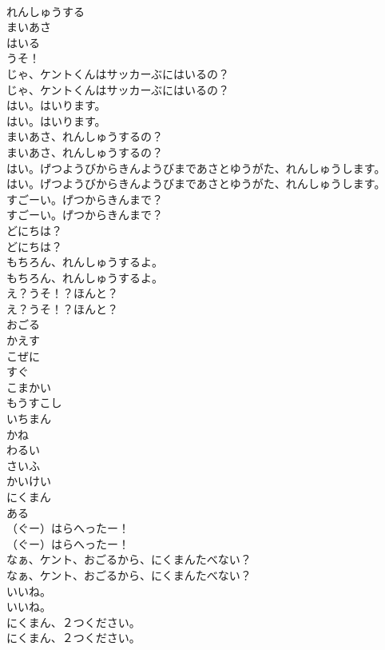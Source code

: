 \documentclass[8pt]{extreport}
\begin{document}
\begin{CJK}{UTF8}{min}
\\	れんしゅうする
\\	まいあさ
\\	はいる
\\	うそ！
\\	じゃ、ケントくんはサッカーぶにはいるの？	
\\	じゃ、ケントくんはサッカーぶにはいるの？ 
\\	はい。はいります。	
\\	はい。はいります。 
\\	まいあさ、れんしゅうするの？	
\\	まいあさ、れんしゅうするの？ 
\\	はい。げつようびからきんようびまであさとゆうがた、れんしゅうします。	
\\	はい。げつようびからきんようびまであさとゆうがた、れんしゅうします。 
\\	すごーい。げつからきんまで？	
\\	すごーい。げつからきんまで？ 
\\	どにちは？	
\\	どにちは？ 
\\	もちろん、れんしゅうするよ。	
\\	もちろん、れんしゅうするよ。 
\\	え？うそ！？ほんと？	
\\	え？うそ！？ほんと？ 
\\	おごる
\\	かえす
\\	こぜに
\\	すぐ
\\	こまかい
\\	もうすこし
\\	いちまん
\\	かね
\\	わるい
\\	さいふ
\\	かいけい
\\	にくまん
\\	ある
\\	（ぐー）はらへったー！	
\\	（ぐー）はらへったー！ 
\\	なぁ、ケント、おごるから、にくまんたべない？	
\\	なぁ、ケント、おごるから、にくまんたべない？ 
\\	いいね。	
\\	いいね。 
\\	にくまん、２つください。	
\\	にくまん、２つください。 

\end{CJK}
\end{document}
